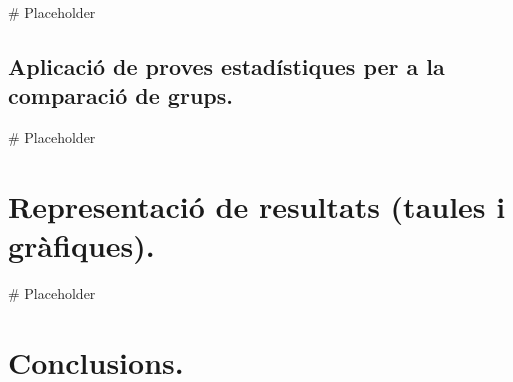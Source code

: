 \documentclass[
]{article}
\newenvironment{Shaded}{\begin{snugshade}}{\end{snugshade}}
\newcommand{\CommentTok}[1]{\textcolor[rgb]{0.50,0.62,0.50}{#1}}
\begin{document}
\begin{Shaded}
\begin{Highlighting}[]
\CommentTok{\# Placeholder}
\end{Highlighting}
\end{Shaded}

\hypertarget{aplicaciuxf3-de-proves-estaduxedstiques-per-a-la-comparaciuxf3-de-grups.}{%
\subsection{Aplicació de proves estadístiques per a la comparació de
grups.}\label{aplicaciuxf3-de-proves-estaduxedstiques-per-a-la-comparaciuxf3-de-grups.}}

\begin{Shaded}
\begin{Highlighting}[]
\CommentTok{\# Placeholder}
\end{Highlighting}
\end{Shaded}

\hypertarget{representaciuxf3-de-resultats-taules-i-gruxe0fiques.}{%
\section{Representació de resultats (taules i
gràfiques).}\label{representaciuxf3-de-resultats-taules-i-gruxe0fiques.}}

\begin{Shaded}
\begin{Highlighting}[]
\CommentTok{\# Placeholder}
\end{Highlighting}
\end{Shaded}

\hypertarget{conclusions.}{%
\section{Conclusions.}\label{conclusions.}}
\end{document}
